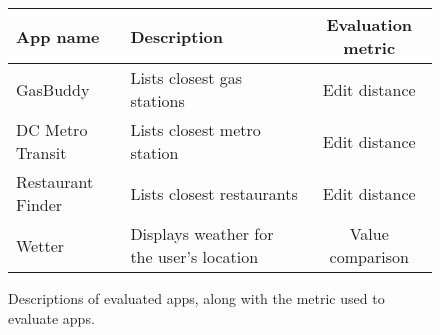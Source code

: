 {
\renewcommand{\footnote}[1]{}
\begin{figure*}[t!]
\begin{minipage}{\textwidth}
  \small
  \centering

  \begin{tabular}{|l|l|c|}
\hline
App name & Description & Evaluation metric
\\
\hline
\hline

GasBuddy & Lists closest gas stations & Edit distance
\\
DC Metro Transit & Lists closest metro station & Edit distance
\\
Restaurant Finder & Lists closest restaurants & Edit distance
\\
Wetter & Displays weather for the user's location & Value comparison
\\

\hline
\end{tabular}

\caption{
  Descriptions of evaluated apps, along with the metric used to evaluate apps.
\label{fig:app-descriptions}
}

\end{minipage}
\end{figure*}
}

